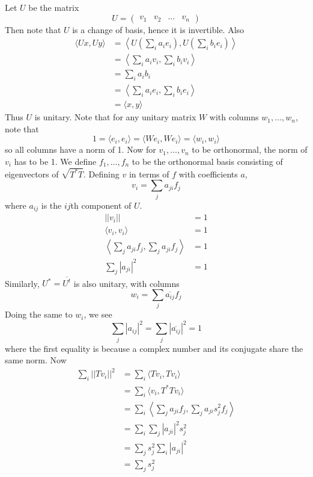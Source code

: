 \documentclass[answers]{exam}
\begin{document}
\begin{questions}

\begin{solution}
	Let $U$ be the matrix
	$$U = \begin{pmatrix} v_1 & v_2 & \dots & v_n \end{pmatrix}$$
	Then note that $U$ is a change of basis, hence it is invertible. Also
	\begin{align*}
		\langle Ux,Uy \rangle &= \left\langle U\left(\sum_i a_ie_i\right),U\left(\sum_i b_ie_i\right) \right\rangle \\
				      &= \left\langle \sum_ia_iv_i, \sum_ib_iv_i \right\rangle \\
				      &= \sum_i a_ib_i \\
				      &= \left\langle \sum_ia_ie_i,\sum_ib_ie_i \right\rangle \\
				      &= \langle x,y \rangle
	\end{align*}
	Thus $U$ is unitary. Note that for any unitary matrix $W$ with columns $w_1,\dots,w_n$, note that
	$$1 = \langle e_i,e_i \rangle = \langle We_i,We_i \rangle = \langle w_i,w_i \rangle$$
	so all columns have a norm of 1. Now for $v_1,\dots,v_n$ to be orthonormal, the norm of $v_i$ has to be 1. We define $f_1,\dots,f_n$ to be the orthonormal basis consisting of eigenvectors of $\sqrt{T^*T}$. Defining $v$ in terms of $f$ with coefficients $a$,
	$$v_i = \sum_j a_{ji}f_j$$
	where $a_{ij}$ is the $ij$th component of $U$.
	\begin{align*}
		||v_i|| &= 1 \\
		\langle v_i,v_i \rangle &= 1 \\
		\left\langle \sum_j a_{ji}f_j,\sum_j a_{ji}f_j \right\rangle &= 1 \\
		\sum_j |a_{ji}|^2 &= 1
	\end{align*}
	Similarly, $U^* = \overline{U^t}$ is also unitary, with columns
	$$w_i = \sum_j \overline{a_{ij}}f_j$$
	Doing the same to $w_i$, we see
	$$\sum_j |a_{ij}|^2 = \sum_j |\overline{a_{ij}}|^2 = 1$$
	where the first equality is because a complex number and its conjugate share the same norm. Now
	\begin{align*}
		\sum_i ||Tv_i||^2 &= \sum_i \langle Tv_i,Tv_i \rangle \\
				  &= \sum_i \langle v_i,T^*Tv_i \rangle \\
				  &= \sum_i \left\langle \sum_ja_{ji}f_j,\sum_ja_{ji}s_j^2f_j \right\rangle \\
				  &= \sum_i \sum_j |a_{ji}|^2s_j^2 \\
				  &= \sum_j s_j^2 \sum_i |a_{ji}|^2 \\
				  &= \sum_j s_j^2
	\end{align*}
\end{solution}


\end{questions}
\end{document}
